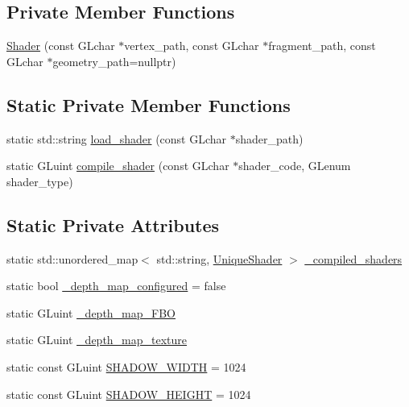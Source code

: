 \subsection*{Private Member Functions}
\begin{DoxyCompactItemize}
\item 
\hyperlink{classLarp_1_1Shader_a02cd13e09037075d62c3566e2fc797ab}{Shader} (const G\+Lchar $\ast$vertex\+\_\+path, const G\+Lchar $\ast$fragment\+\_\+path, const G\+Lchar $\ast$geometry\+\_\+path=nullptr)
\end{DoxyCompactItemize}
\subsection*{Static Private Member Functions}
\begin{DoxyCompactItemize}
\item 
static std\+::string \hyperlink{classLarp_1_1Shader_abf92153766512f9180d0d85062625446}{load\+\_\+shader} (const G\+Lchar $\ast$shader\+\_\+path)
\item 
static G\+Luint \hyperlink{classLarp_1_1Shader_a2fc91576272847f5cd5b9f424677a9cb}{compile\+\_\+shader} (const G\+Lchar $\ast$shader\+\_\+code, G\+Lenum shader\+\_\+type)
\end{DoxyCompactItemize}
\subsection*{Static Private Attributes}
\begin{DoxyCompactItemize}
\item 
static std\+::unordered\+\_\+map$<$ std\+::string, \hyperlink{namespaceLarp_a0e50ce889dd41e1be4ced22511b7f80a}{Unique\+Shader} $>$ \hyperlink{classLarp_1_1Shader_ae703958195907f241cbeeee4f590557d}{\+\_\+compiled\+\_\+shaders}
\item 
static bool \hyperlink{classLarp_1_1Shader_a4cbaff7764a508ced1df527b2bb084c0}{\+\_\+depth\+\_\+map\+\_\+configured} = false
\item 
static G\+Luint \hyperlink{classLarp_1_1Shader_ac5489cdb566ed9b675d5544f4d849510}{\+\_\+depth\+\_\+map\+\_\+\+F\+BO}
\item 
static G\+Luint \hyperlink{classLarp_1_1Shader_a456655b265e1c69c671d20bd9c26d470}{\+\_\+depth\+\_\+map\+\_\+texture}
\item 
static const G\+Luint \hyperlink{classLarp_1_1Shader_a330453400ea364bfcf40f0f4f881b64e}{S\+H\+A\+D\+O\+W\+\_\+\+W\+I\+D\+TH} = 1024
\item 
static const G\+Luint \hyperlink{classLarp_1_1Shader_aa37c97ad8e4b8e9bff61dc3c3c170155}{S\+H\+A\+D\+O\+W\+\_\+\+H\+E\+I\+G\+HT} = 1024
\end{DoxyCompactItemize}


